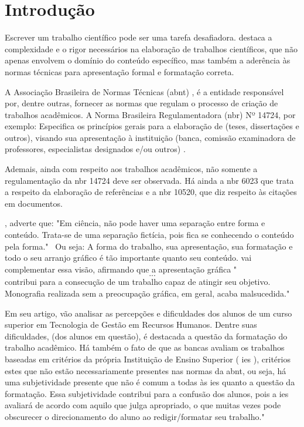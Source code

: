 \chapter{Introdução}

Escrever um trabalho científico pode ser uma tarefa desafiadora. \cite{severino}
destaca a complexidade e o rigor necessários na elaboração de trabalhos científicos, que não
apenas envolvem o domínio do conteúdo específico, mas também a aderência às normas
técnicas para apresentação formal e formatação correta.

A Associação Brasileira de Normas Técnicas 
(\acrshort{abnt})
, é a entidade responsável por,
dentre outras, fornecer as normas que regulam o processo de criação de trabalhos acadêmicos.
A Norma Brasileira Regulamentadora 
(\acrshort{nbr})
 Nº 14724, por exemplo: Especifica os princípios
gerais para a elaboração de (teses, dissertações e outros), visando sua apresentação à
instituição (banca, comissão examinadora de professores, especialistas designados e/ou
outros)
\cite{abnt}.

Ademais, ainda com respeito aos trabalhos acadêmicos, não somente a
regulamentação da 
\acrshort{nbr}
14724 deve ser observada. Há ainda a 
\acrshort{nbr}
6023 que trata a respeito
da elaboração de referências e a 
\acrshort{nbr}
10520, que diz respeito às citações em documentos.

\cite{castro}, adverte que: "Em ciência, não pode haver uma
separação entre forma e conteúdo. Trata-se de uma separação fictícia, pois fica se conhecendo
o conteúdo pela forma."~ Ou seja: A forma do trabalho, sua apresentação, sua formatação e
todo o seu arranjo gráfico é tão importante quanto seu conteúdo. 
\cite{medeiros} vai
complementar essa visão, afirmando que a apresentação gráfica "\[...\] contribui para a
consecução de um trabalho capaz de atingir seu objetivo. Monografia realizada sem a
preocupação gráfica, em geral, acaba malsucedida."~

Em seu artigo, 
\cite{SilvaVitoria}
vão analisar as percepções e dificuldades dos
alunos de um curso superior em Tecnologia de Gestão em Recursos Humanos. Dentre suas
dificuldades, (dos alunos em questão), é destacada a questão da formatação do trabalho
acadêmico. Há também o fato de que as bancas avaliam os trabalhos baseadas em critérios da
própria Instituição de Ensino Superior (
\acrshort{ies}
), critérios estes que não estão necessariamente
presentes nas normas da \acrshort{abnt}, ou seja, há uma subjetividade presente que não é comum a
todas às \acrshort{ies} quanto a questão da formatação. Essa subjetividade contribui para a confusão dos
alunos, pois a \acrshort{ies} avaliará de acordo com aquilo que julga apropriado, o que muitas vezes
pode obscurecer o direcionamento do aluno ao redigir/formatar seu trabalho."~

